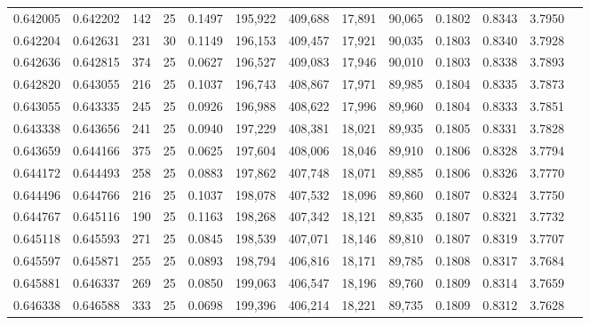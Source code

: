 \begin{tabular}{rrrrrrrrrrrrr}
0.642005 & 0.642202 &   142 &  25 &                                     0.1497 & 195,922 & 409,688 &  17,891 &  90,065 & 0.1802 & 0.8343 & 3.7950 \\
0.642204 & 0.642631 &   231 &  30 &                                     0.1149 & 196,153 & 409,457 &  17,921 &  90,035 & 0.1803 & 0.8340 & 3.7928 \\
0.642636 & 0.642815 &   374 &  25 &                                     0.0627 & 196,527 & 409,083 &  17,946 &  90,010 & 0.1803 & 0.8338 & 3.7893 \\
0.642820 & 0.643055 &   216 &  25 &                                     0.1037 & 196,743 & 408,867 &  17,971 &  89,985 & 0.1804 & 0.8335 & 3.7873 \\
0.643055 & 0.643335 &   245 &  25 &                                     0.0926 & 196,988 & 408,622 &  17,996 &  89,960 & 0.1804 & 0.8333 & 3.7851 \\
0.643338 & 0.643656 &   241 &  25 &                                     0.0940 & 197,229 & 408,381 &  18,021 &  89,935 & 0.1805 & 0.8331 & 3.7828 \\
0.643659 & 0.644166 &   375 &  25 &                                     0.0625 & 197,604 & 408,006 &  18,046 &  89,910 & 0.1806 & 0.8328 & 3.7794 \\
0.644172 & 0.644493 &   258 &  25 &                                     0.0883 & 197,862 & 407,748 &  18,071 &  89,885 & 0.1806 & 0.8326 & 3.7770 \\
0.644496 & 0.644766 &   216 &  25 &                                     0.1037 & 198,078 & 407,532 &  18,096 &  89,860 & 0.1807 & 0.8324 & 3.7750 \\
0.644767 & 0.645116 &   190 &  25 &                                     0.1163 & 198,268 & 407,342 &  18,121 &  89,835 & 0.1807 & 0.8321 & 3.7732 \\
0.645118 & 0.645593 &   271 &  25 &                                     0.0845 & 198,539 & 407,071 &  18,146 &  89,810 & 0.1807 & 0.8319 & 3.7707 \\
0.645597 & 0.645871 &   255 &  25 &                                     0.0893 & 198,794 & 406,816 &  18,171 &  89,785 & 0.1808 & 0.8317 & 3.7684 \\
0.645881 & 0.646337 &   269 &  25 &                                     0.0850 & 199,063 & 406,547 &  18,196 &  89,760 & 0.1809 & 0.8314 & 3.7659 \\
0.646338 & 0.646588 &   333 &  25 &                                     0.0698 & 199,396 & 406,214 &  18,221 &  89,735 & 0.1809 & 0.8312 & 3.7628 \\

\end{tabular}
